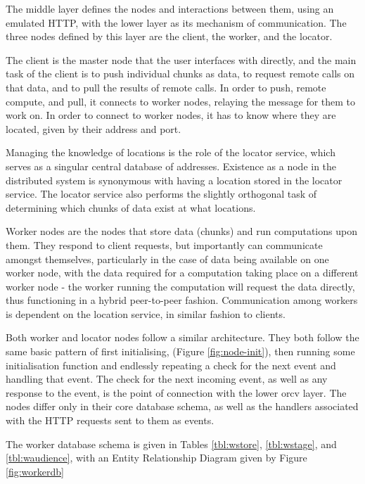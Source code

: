 The middle layer  defines the nodes and interactions between them, using an emulated HTTP, with the lower  layer as its mechanism of communication.
The three nodes defined by this layer are the client, the worker, and the locator.

The client is the master node that the user interfaces with directly, and the main task of the client is to push individual chunks as data, to request remote calls on that data, and to pull the results of remote calls.
In order to push, remote compute, and pull, it connects to worker nodes, relaying the message for them to work on.
In order to connect to worker nodes, it has to know where they are located, given by their address and port.

Managing the knowledge of locations is the role of the locator service, which serves as a singular central database of addresses.
Existence as a node in the distributed system is synonymous with having a location stored in the locator service.
The locator service also performs the slightly orthogonal task of determining which chunks of data exist at what locations.

Worker nodes are the nodes that store data (chunks) and run computations upon them.
They respond to client requests, but importantly can communicate amongst themselves, particularly in the case of data being available on one worker node, with the data required for a computation taking place on a different worker node - the worker running the computation will request the data directly, thus functioning in a hybrid peer-to-peer fashion.
Communication among workers is dependent on the location service, in similar fashion to clients.

Both worker and locator nodes follow a similar architecture.
They both follow the same basic pattern of first initialising, (Figure \cref{fig:node-init}), then running some initialisation function and endlessly repeating a check for the next event and handling that event.
The check for the next incoming event, as well as any response to the event, is the point of connection with the lower orcv layer.
The nodes differ only in their core database schema, as well as the handlers associated with the HTTP requests sent to them as events.

The worker database schema is given in Tables \cref{tbl:wstore}, \cref{tbl:wstage}, and \cref{tbl:waudience}, with an Entity Relationship Diagram given by Figure \cref{fig:workerdb}


